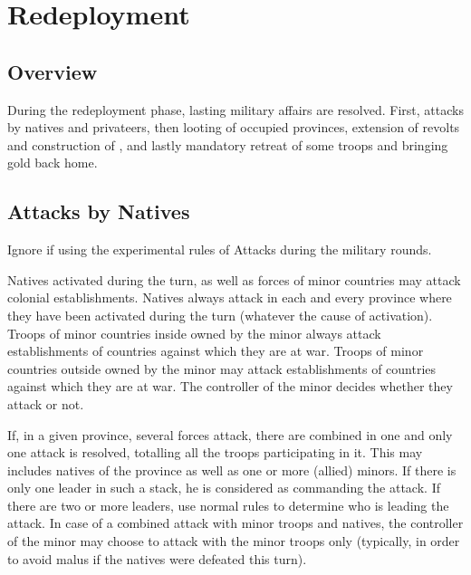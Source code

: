 \chapter{Redeployment}\label{chapter:Redep}


\section{Overview}

\aparag During the redeployment phase, lasting military affairs are
resolved. First, attacks by natives and privateers, then looting of
occupied provinces, extension of revolts and construction of \Presidios,
and lastly mandatory retreat of some troops and bringing \ROTW gold back
home.

\aparag[Sequence.]
\RedepDetails

\section{Attacks by Natives}\label{chRedep:Native Attack}
\begin{designnote}
  Ignore if using the experimental rules of Attacks during the military
  rounds.
\end{designnote}

\aparag Natives activated during the turn, as well as forces of \ROTW minor
countries may attack colonial establishments.
\bparag Natives always attack in each and every province where they have been
activated during the turn (whatever the cause of activation).
\bparag Troops of \ROTW minor countries inside \Areas owned by the minor
always attack establishments of countries against which they are at war.
\bparag Troops of \ROTW minor countries outside \Areas owned by the minor may
attack establishments of countries against which they are at war. The
controller of the minor decides whether they attack or not.

\bparag If, in a given province, several forces attack, there are combined in
one and only one attack is resolved, totalling all the troops participating in
it.
\bparag This may includes natives of the province as well as one or more
(allied) \ROTW minors.
\bparag If there is only one leader in such a stack, he is considered as
commanding the attack. If there are two or more leaders, use normal rules to
determine who is leading the attack.
\bparag In case of a combined attack with minor troops and natives, the
controller of the minor may choose to attack with the minor troops only
(typically, in order to avoid malus if the natives were defeated this turn).

